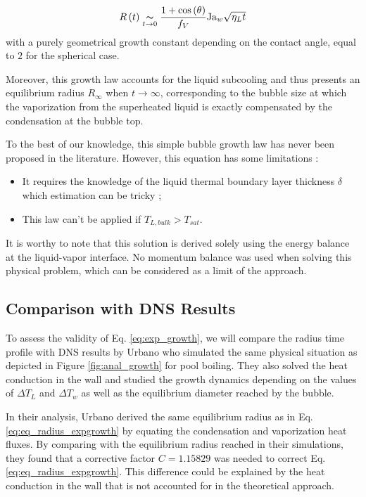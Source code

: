\begin{equation}
R\left( t \right) \underset{t \to 0}{\thicksim} \frac{1+\mathrm{cos}\left( \theta \right)}{f_{V}}\mathrm{Ja}_{w} \sqrt{\eta_{L}t}
\end{equation}
with a purely geometrical growth constant depending on the contact angle, equal to $2$ for the spherical case.

\npar
Moreover, this growth law accounts for the liquid subcooling and thus presents an equilibrium radius $R_{\infty}$ when $t\to \infty$, corresponding to the bubble size at which the vaporization from the superheated liquid is exactly compensated by the condensation at the bubble top.

\npar
To the best of our knowledge, this simple bubble growth law has never been proposed in the literature. However, this equation has some limitations :

\begin{itemize}
\item It requires the knowledge of the liquid thermal boundary layer thickness $\delta$ which estimation can be tricky ;

\item This law can't be applied if $T_{L,bulk}>T_{sat}$.
\end{itemize} 


\begin{remark*}{}
It is worthy to note that this solution is derived solely using the energy balance at the liquid-vapor interface. No momentum balance was used when solving this physical problem, which can be considered as a limit of the approach.
\end{remark*}


\subsection{Comparison with DNS Results}

To assess the validity of Eq. \ref{eq:exp_growth}, we will compare the radius time profile with DNS results by Urbano \etal \cite{urbano_direct_2019} who simulated the same physical situation as depicted in Figure \ref{fig:anal_growth} for pool boiling. They also solved the heat conduction in the wall and studied the growth dynamics depending on the values of $\Delta T_{L}$ and $\Delta T_{w}$ as well as the equilibrium diameter reached by the bubble.

\npar

In their analysis, Urbano \etal derived the same equilibrium radius as in Eq. \ref{eq:eq_radius_expgrowth} by equating the condensation and vaporization heat fluxes. By comparing with the equilibrium radius reached in their simulations, they found that a corrective factor $C=1.15829$ was needed to correct Eq. \ref{eq:eq_radius_expgrowth}. This difference could be explained by the heat conduction in the wall that is not accounted for in the theoretical approach.


